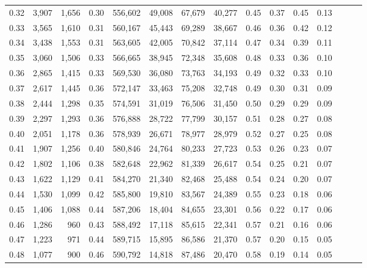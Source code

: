 \begin{tabular}{rrrrrrrrrrrrrrr}
0.32 &   3,907 &  1,656 &  0.30 &  556,602 &   49,008 &   67,679 &   40,277 &  0.45 &  0.37 &  0.45 &      0.13 \\
0.33 &   3,565 &  1,610 &  0.31 &  560,167 &   45,443 &   69,289 &   38,667 &  0.46 &  0.36 &  0.42 &      0.12 \\
0.34 &   3,438 &  1,553 &  0.31 &  563,605 &   42,005 &   70,842 &   37,114 &  0.47 &  0.34 &  0.39 &      0.11 \\
0.35 &   3,060 &  1,506 &  0.33 &  566,665 &   38,945 &   72,348 &   35,608 &  0.48 &  0.33 &  0.36 &      0.10 \\
0.36 &   2,865 &  1,415 &  0.33 &  569,530 &   36,080 &   73,763 &   34,193 &  0.49 &  0.32 &  0.33 &      0.10 \\
0.37 &   2,617 &  1,445 &  0.36 &  572,147 &   33,463 &   75,208 &   32,748 &  0.49 &  0.30 &  0.31 &      0.09 \\
0.38 &   2,444 &  1,298 &  0.35 &  574,591 &   31,019 &   76,506 &   31,450 &  0.50 &  0.29 &  0.29 &      0.09 \\
0.39 &   2,297 &  1,293 &  0.36 &  576,888 &   28,722 &   77,799 &   30,157 &  0.51 &  0.28 &  0.27 &      0.08 \\
0.40 &   2,051 &  1,178 &  0.36 &  578,939 &   26,671 &   78,977 &   28,979 &  0.52 &  0.27 &  0.25 &      0.08 \\
0.41 &   1,907 &  1,256 &  0.40 &  580,846 &   24,764 &   80,233 &   27,723 &  0.53 &  0.26 &  0.23 &      0.07 \\
0.42 &   1,802 &  1,106 &  0.38 &  582,648 &   22,962 &   81,339 &   26,617 &  0.54 &  0.25 &  0.21 &      0.07 \\
0.43 &   1,622 &  1,129 &  0.41 &  584,270 &   21,340 &   82,468 &   25,488 &  0.54 &  0.24 &  0.20 &      0.07 \\
0.44 &   1,530 &  1,099 &  0.42 &  585,800 &   19,810 &   83,567 &   24,389 &  0.55 &  0.23 &  0.18 &      0.06 \\
0.45 &   1,406 &  1,088 &  0.44 &  587,206 &   18,404 &   84,655 &   23,301 &  0.56 &  0.22 &  0.17 &      0.06 \\
0.46 &   1,286 &    960 &  0.43 &  588,492 &   17,118 &   85,615 &   22,341 &  0.57 &  0.21 &  0.16 &      0.06 \\
0.47 &   1,223 &    971 &  0.44 &  589,715 &   15,895 &   86,586 &   21,370 &  0.57 &  0.20 &  0.15 &      0.05 \\
0.48 &   1,077 &    900 &  0.46 &  590,792 &   14,818 &   87,486 &   20,470 &  0.58 &  0.19 &  0.14 &      0.05 \\

\end{tabular}
